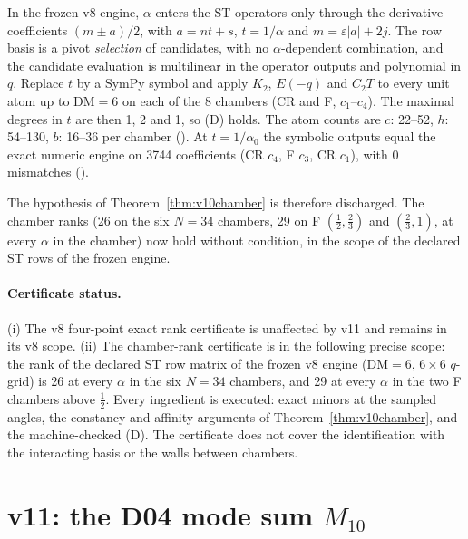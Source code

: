 \begin{proposition}
\label{prop:v11D}
In the frozen v8 engine, \(\alpha\) enters the ST operators only
through the derivative coefficients \((m\pm a)/2\), with
\(a=nt+s\), \(t=1/\alpha\) and \(m=\varepsilon|a|+2j\). The row
basis is a pivot \emph{selection} of candidates, with no
\(\alpha\)-dependent combination, and the candidate evaluation is
multilinear in the operator outputs and polynomial in \(q\).
Replace \(t\) by a SymPy symbol and apply \(K_2\), \(E(-q)\) and
\(C_2T\) to every unit atom up to \(\mathrm{DM}=6\) on each of the
8 chambers (CR and F, \(c_1\)--\(c_4\)). The maximal degrees in
\(t\) are then 1, 2 and 1, so (D) holds. The atom counts are
\(c\): 22--52, \(h\): 54--130, \(b\): 16--36 per chamber
(). At \(t=1/\alpha_0\) the symbolic
outputs equal the exact numeric engine on 3744 coefficients (CR
\(c_4\), F \(c_3\), CR \(c_1\)), with 0 mismatches
().
\end{proposition}
The hypothesis of Theorem~\ref{thm:v10chamber} is therefore
discharged. The chamber ranks (26 on the six \(N=34\) chambers, 29
on F \((\tfrac12,\tfrac23)\) and \((\tfrac23,1)\), at every
\(\alpha\) in the chamber) now hold without condition, in the scope
of the declared ST rows of the frozen engine.

\paragraph{Certificate status.} (i) The v8 four-point exact rank
certificate is unaffected by v11 and remains
\CPIR{} in its v8 scope. (ii) The chamber-rank certificate is
\CPIR{} in the following precise scope: the rank of the declared ST
row matrix of the frozen v8 engine (\(\mathrm{DM}=6\), \(6\times6\)
\(q\)-grid) is 26 at every \(\alpha\) in the six \(N=34\) chambers,
and 29 at every \(\alpha\) in the two F chambers above
\(\tfrac12\). Every ingredient is executed: exact minors at the
sampled angles, the constancy and affinity arguments of
Theorem~\ref{thm:v10chamber}, and the machine-checked (D). The
certificate does not cover the identification with the interacting
basis or the walls between chambers.

\section{v11: the D04 mode sum \texorpdfstring{\(M_{10}\)}{M10}}
\label{sec:v11M10}

